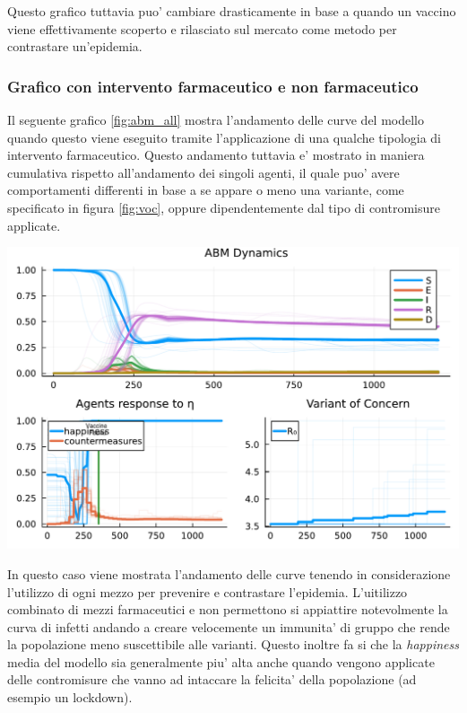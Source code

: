 Questo grafico tuttavia puo' cambiare drasticamente in base a quando un vaccino viene effettivamente scoperto e 
rilasciato sul mercato come metodo per contrastare un'epidemia.

\subsubsection*{Grafico con intervento farmaceutico e non farmaceutico}
Il seguente grafico \ref{fig:abm_all} mostra l'andamento delle curve del modello
quando questo viene eseguito tramite l'applicazione di una qualche tipologia di intervento farmaceutico. 
Questo andamento tuttavia e' mostrato in maniera cumulativa rispetto all'andamento dei singoli agenti, 
il quale puo' avere comportamenti differenti in base a se appare o meno una variante, 
come specificato in figura \ref{fig:voc}, oppure dipendentemente dal tipo di contromisure applicate.

\begin{minipage}{\linewidth}
	\centering
	\includegraphics[width=\textwidth]{img/SocialNetworkABM_ALL.pdf}
	\label{fig:abm_all}
\end{minipage}

In questo caso viene mostrata l'andamento delle curve tenendo in considerazione l'utilizzo di ogni mezzo
per prevenire e contrastare l'epidemia. L'uitilizzo combinato di mezzi farmaceutici e non permettono 
si appiattire notevolmente la curva di infetti andando a creare velocemente un immunita' di gruppo 
che rende la popolazione meno suscettibile alle varianti. Questo inoltre fa si che la \emph{happiness} media
del modello sia generalmente piu' alta anche quando vengono applicate delle contromisure che vanno ad 
intaccare la felicita' della popolazione (ad esempio un lockdown). 

